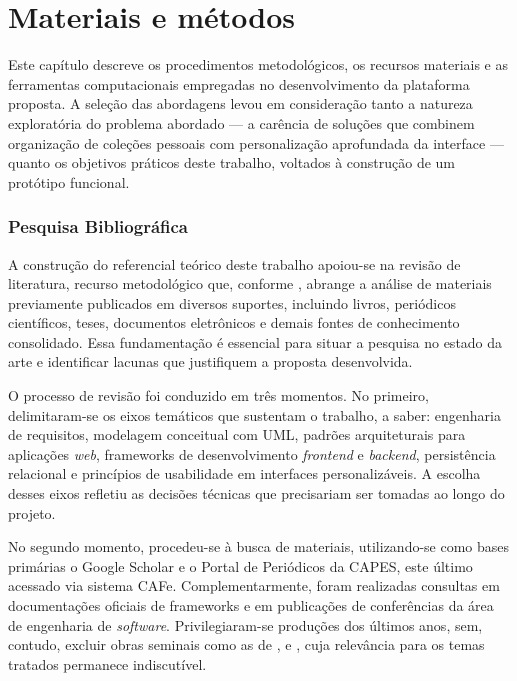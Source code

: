 \chapter{Materiais e métodos}
\label{cap:03}

Este capítulo descreve os procedimentos metodológicos, os recursos materiais e as ferramentas computacionais empregadas no desenvolvimento da plataforma proposta. A seleção das abordagens levou em consideração tanto a natureza exploratória do problema abordado --- a carência de soluções que combinem organização de coleções pessoais com personalização aprofundada da interface --- quanto os objetivos práticos deste trabalho, voltados à construção de um protótipo funcional.

\subsection{Pesquisa Bibliográfica}

A construção do referencial teórico deste trabalho apoiou-se na revisão de literatura, recurso metodológico que, conforme \cite{fontelles2009}, abrange a análise de materiais previamente publicados em diversos suportes, incluindo livros, periódicos científicos, teses, documentos eletrônicos e demais fontes de conhecimento consolidado. Essa fundamentação é essencial para situar a pesquisa no estado da arte e identificar lacunas que justifiquem a proposta desenvolvida.

O processo de revisão foi conduzido em três momentos. No primeiro, delimitaram-se os eixos temáticos que sustentam o trabalho, a saber: engenharia de requisitos, modelagem conceitual com UML, padrões arquiteturais para aplicações \textit{web}, frameworks de desenvolvimento \textit{frontend} e \textit{backend}, persistência relacional e princípios de usabilidade em interfaces personalizáveis. A escolha desses eixos refletiu as decisões técnicas que precisariam ser tomadas ao longo do projeto.

No segundo momento, procedeu-se à busca de materiais, utilizando-se como bases primárias o Google Scholar e o Portal de Periódicos da CAPES, este último acessado via sistema CAFe. Complementarmente, foram realizadas consultas em documentações oficiais de frameworks e em publicações de conferências da área de engenharia de \textit{software}. Privilegiaram-se produções dos últimos anos, sem, contudo, excluir obras seminais como as de \textcite{Sommerville2011}, \textcite{PressmanMaxim2016} e \textcite{Larman2007}, cuja relevância para os temas tratados permanece indiscutível.

